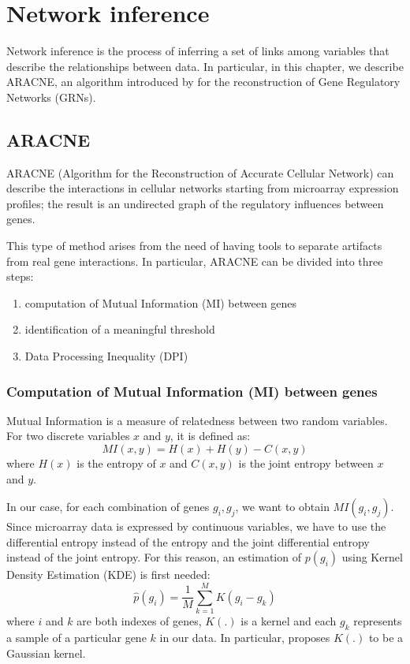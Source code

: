 \chapter{Network inference}

Network inference is the process of inferring a set of links among variables
that describe the relationships between data.
In particular, in this chapter, we describe ARACNE, an algorithm introduced by \cite{DBLP:journals/bmcbi/MargolinNBWSFC06}
for the reconstruction of Gene Regulatory Networks (GRNs).

\section{ARACNE}
ARACNE (Algorithm for the Reconstruction of Accurate Cellular Network)
can describe the interactions in cellular networks
starting from microarray expression profiles;
the result is an undirected graph of the regulatory influences between genes.

This type of method arises from the need of having tools to separate artifacts
from real gene interactions.
In particular, ARACNE can be divided into three steps:
\begin{enumerate}
    \item computation of Mutual Information (MI) between genes
    \item identification of a meaningful threshold
    \item Data Processing Inequality (DPI)
\end{enumerate}

\subsection{Computation of Mutual Information (MI) between genes} \label{MI}
Mutual Information is a measure of relatedness between two random variables.
For two discrete variables $x$ and $y$, it is defined as:
\[ \mathit{MI}(x, y) = H(x) + H(y) - C(x, y) \]
where $H(x)$ is the entropy of $x$ and $C(x, y)$ is the joint entropy between $x$ and $y$.

In our case, for each combination of genes $g_i, g_j$,
we want to obtain $\mathit{MI}(g_i, g_j)$.
Since microarray data is expressed by continuous variables,
we have to use the differential entropy instead of the entropy
and the joint differential entropy instead of the joint entropy.
For this reason, an estimation of $p(g_i)$
using Kernel Density Estimation (KDE) is first needed:
\[ \hat{p}(g_i) = \frac{1}{M} \sum_{k=1}^{M} K(g_i - g_{k}) \]
where $i$ and $k$ are both indexes of genes,
$K(.)$ is a kernel and each $g_k$
represents a sample of a particular gene $k$ in our data.
In particular, \cite{DBLP:journals/bmcbi/MargolinNBWSFC06} proposes
$K(.)$ to be a Gaussian kernel.

